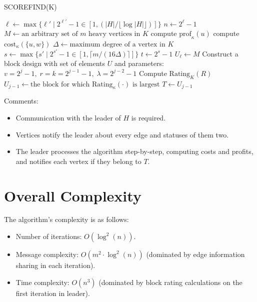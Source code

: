 \documentclass{article}
\begin{document}
\begin{algorithm}[H]
    \caption{SCOREFIND(K)}
    \begin{algorithmic}[1]
        \STATE $\ell \gets \max\{ \ell' \mid 2^{\ell'} - 1 \in [1, (|H| / \lfloor \log |H| \rfloor)] \}$
        \STATE $n \gets 2^\ell - 1$
        \STATE $M \gets \text{an arbitrary set of $m$ heavy vertices in $K$}$
            \STATE compute $\text{prof}_{\kappa}(u)$
        \ENDFOR
            \STATE compute $\text{cost}_{\kappa}(\{u, w\})$
        \ENDFOR
        \STATE $\Delta \gets \text{maximum degree of a vertex in $K$}$
        \STATE $s \gets \max\{s' \mid 2^{s'} - 1 \in [1, \lceil m / (16 \Delta) \rceil] \}$
        \STATE $t \gets 2^s - 1$
        \STATE $U_\ell \gets M$
            \STATE Construct a block design with set of elements $U$ and parameters:
            \STATE $v = 2^j - 1, \; r = k = 2^{j-1} - 1, \; \lambda = 2^{j-2} - 1$
                \STATE Compute $\text{Rating}_{K}(R)$
            \ENDFOR
            \STATE $U_{j-1} \gets \text{the block for which $\text{Rating}_{\kappa}(\cdot)$ is largest}$
        \ENDFOR
        \STATE $T \gets U_{j-1}$
    \end{algorithmic}
\end{algorithm}

Comments:
\begin{itemize}
    \item Communication with the leader of $H$ is required.
    \item Vertices notify the leader about every edge and statuses of them two.
    \item The leader processes the algorithm step-by-step, computing costs and profits, and notifies each vertex if they belong to $T$.
\end{itemize}

\section*{Overall Complexity}

The algorithm's complexity is as follows:
\begin{itemize}
    \item Number of iterations: $O(\log^2(n))$.
    \item Message complexity: $O(m^2 \cdot \log^2(n))$ (dominated by edge information sharing in each iteration).
    \item Time complexity: $O(n^3)$ (dominated by block rating calculations on the first iteration in leader).
\end{itemize}
\end{document}
